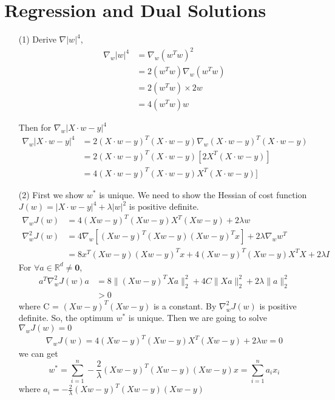 \documentclass[a4paper,12pt]{article}
\begin{document}
\clearpage
\section{Regression and Dual Solutions}
\begin{itemize}
\item[(1)]
Derive $\nabla |w|^4$,
\begin{align*}
\nabla_w |w|^4 &= \nabla_w (w^T w)^2  \\
			     &= 2 (w^T w)  \nabla_w (w^T w) \\
			     &= 2 (w^T w) \times 2w \\
			     &= 4 (w^T w)w
\end{align*}

Then for $\nabla_w |X\cdot w -y|^4$
\begin{align*}
\nabla_w |X\cdot w -y|^4 &= 2 (X \cdot w -y)^T(X\cdot w -y)  \nabla_w (X \cdot w -y)^T (X \cdot w -y) \\
				      &= 2 (X\cdot w -y)^T(X \cdot w -y) \left [ 2 X^T (X \cdot w -y) \right ] \\
				      &=4 (X\cdot w -y)^T(X \cdot w -y) X^T (X\cdot w -y) ] 
\end{align*}


\clearpage
\item[(2)]
First we show $w^*$ is unique. We need to show the Hessian of cost function $J(w) = |X\cdot w -y|^4  + \lambda |w|^2$ is positive definite. 
\begin{align*}
\nabla_w J(w)
&= 4 (X w - y)^T(X w -y) X^T (X w-y) + 2 \lambda w\\
\nabla^2_w J(w)
&= 4\nabla_w \left [ (X w - y)^T(X w -y) (X w -y)^T x \right] + 2 \lambda  \nabla_w w^T\\
&= 8 x^T (X w - y)(X w-y)^T x + 4 (X w - y)^T(X w -y)  X^T X + 2 \lambda I
\end{align*}
For $\forall a \in \mathbb{R}^d \ne \textbf{0}$,
\begin{align*}
a^T \nabla^2_w J(w) a &= 8 \| (X w -y )^T X a\|_2^2 + 4C \| X a\|_2^2 + 2 \lambda \| a\|_2^2\\
&>0
\end{align*}
where C = $(X w - y)^T(X w -y) $ is a constant. By $\nabla^2_w J(w)$ is positive definite. So, the optimum $w^*$ is unique. Then we are going to solve $\nabla_w J(w) = 0$
\begin{align*}
\nabla_w J(w) = 4 (X w - y)^T(X w -y) X^T (X w-y) + 2 \lambda w = 0
\end{align*}
we can get 
$$
w^* = \sum_{i=1}^n -\frac{2}{\lambda} (X w - y)^T(X w-y)(X w -y) x = \sum_{i=1}^n a_i x_i
$$
where $a_i = -\frac{2}{\lambda} (X w - y)^T(X w-y)(X w -y)$


\end{itemize}
\end{document}
